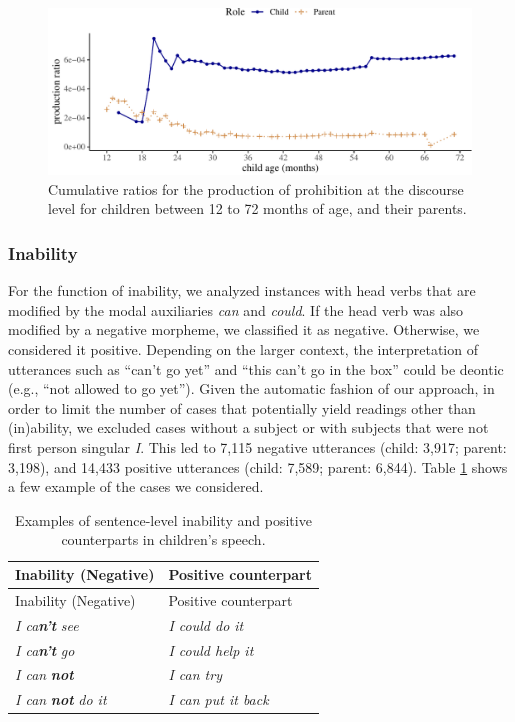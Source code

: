 \documentclass[
  man,floatsintext]{apa6}
\begin{document}
\begin{figure}[H]

{\centering \includegraphics{neg_construction_article_files/figure-latex/prohibitiondiscourse-1} 

}

\caption{Cumulative ratios for the production of prohibition at the discourse level for children between 12 to 72 months of age, and their parents.}\label{fig:prohibitiondiscourse}
\end{figure}

\hypertarget{inability}{%
\subsubsection{Inability}\label{inability}}

For the function of inability, we analyzed instances with head verbs that are modified by the modal auxiliaries \emph{can} and \emph{could}. If the head verb was also modified by a negative morpheme, we classified it as negative. Otherwise, we considered it positive. Depending on the larger context, the interpretation of utterances such as ``can't go yet'' and ``this can't go in the box'' could be deontic (e.g., ``not allowed to go yet''). Given the automatic fashion of our approach, in order to limit the number of cases that potentially yield readings other than (in)ability, we excluded cases without a subject or with subjects that were not first person singular \emph{I}. This led to 7,115 negative utterances (child: 3,917; parent: 3,198), and 14,433 positive utterances (child: 7,589; parent: 6,844). Table \ref{tab:inab} shows a few example of the cases we considered.

\begin{longtable}[]{@{}ll@{}}
\caption{\label{tab:inab} Examples of sentence-level inability and positive counterparts in children's speech.}\tabularnewline
\toprule\noalign{}
Inability (Negative) & Positive counterpart \\
\midrule\noalign{}
\endfirsthead
\toprule\noalign{}
Inability (Negative) & Positive counterpart \\
\midrule\noalign{}
\endhead
\bottomrule\noalign{}
\endlastfoot
\emph{I ca\textbf{n't}} \emph{see} & \emph{I could do it} \\
\emph{I ca\textbf{n't}} \emph{go} & \emph{I could help it} \\
\emph{I can} \textbf{\emph{not}} & \emph{I can try} \\
\emph{I can} \textbf{\emph{not}} \emph{do it} & \emph{I can put it back} \\
\end{longtable}
\end{document}
